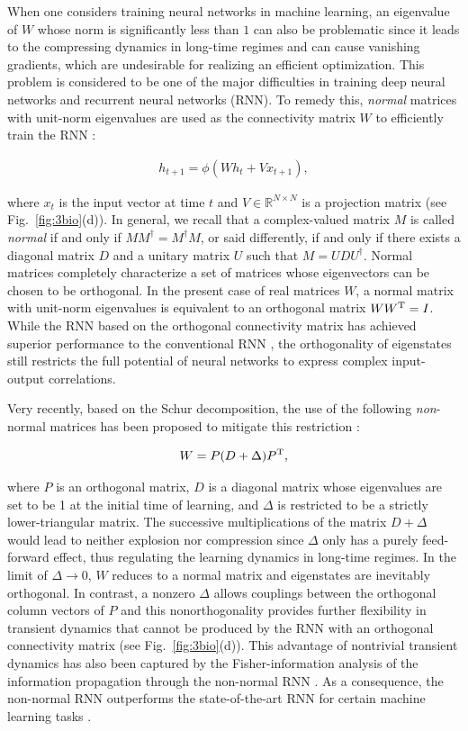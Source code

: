 \documentclass{tADP2e}
\theoremstyle{plain}
\newcommand{\eqn}[1]{
\begin{eqnarray}
	#1
\end{eqnarray}
}
\theoremstyle{plain}
\theoremstyle{definition}
\begin{document}
When one considers training neural networks in machine learning, an eigenvalue of $W$ whose norm is significantly less than $1$ can also be problematic since it leads to the compressing dynamics in long-time regimes and can cause  vanishing gradients, which are undesirable for realizing an efficient optimization. This problem is considered to be one of the major difficulties in training deep neural networks and recurrent neural networks (RNN). To remedy this, {\it normal} matrices with unit-norm eigenvalues are used as the connectivity matrix $W$ to efficiently train the RNN \cite{AM16,VE17}:
\eqn{
h_{t+1}=\phi(Wh_t+Vx_{t+1}),
}
where $x_t$ is the input vector at time $t$ and $V{\in}{\mathbb R}^{N\times N}$ is a projection matrix (see Fig.~\ref{fig:3bio}(d)). In general, we recall that a complex-valued matrix $M$ is called {\it normal} if and only if $MM^\dagger=M^\dagger M$, or said differently, if and only if there exists a diagonal matrix $D$ and a unitary matrix $U$ such that $M=UDU^\dagger$. Normal matrices completely characterize a set of matrices whose eigenvectors can be chosen to be orthogonal. 
In the present case of real matrices $W$, a normal matrix with unit-norm eigenvalues is equivalent to an orthogonal matrix $WW^{\rm T}=I$. 
 While the RNN based on the orthogonal connectivity matrix has achieved superior performance to the conventional RNN \cite{AM16,VE17}, the orthogonality of eigenstates still restricts the full potential of neural networks to express complex input-output correlations. 
 
Very recently, based on the Schur decomposition, the use of the following {\it non}-normal matrices has been proposed to mitigate this restriction \cite{GS08,KG19}:
\eqn{\label{sec3nonnormal}
W=P(D+\Delta)P^{\rm T},
}
where $P$ is an orthogonal matrix, $D$ is a diagonal matrix whose eigenvalues are set to be 1 at the initial time of learning, and $\Delta$ is restricted to be a strictly lower-triangular matrix. The successive multiplications of the matrix $D+\Delta$ would lead to neither explosion nor compression since $\Delta$ only has a purely feed-forward effect, thus regulating the learning dynamics in long-time regimes. In the limit of $\Delta\to 0$, $W$ reduces to a normal matrix and eigenstates are inevitably orthogonal. In contrast, a nonzero $\Delta$ allows couplings between the orthogonal column vectors of $P$ and this nonorthogonality provides further flexibility in transient dynamics \cite{GS08,GMS09,HG12} that cannot be produced by the RNN with an orthogonal connectivity matrix \cite{AM16,VE17} (see Fig.~\ref{fig:3bio}(d)). This advantage of nontrivial transient dynamics has also been captured by the Fisher-information analysis of the information propagation through the non-normal RNN \cite{GS08}.  As a consequence, the non-normal RNN outperforms the state-of-the-art RNN for certain machine learning tasks \cite{KG19}.   
\end{document}
